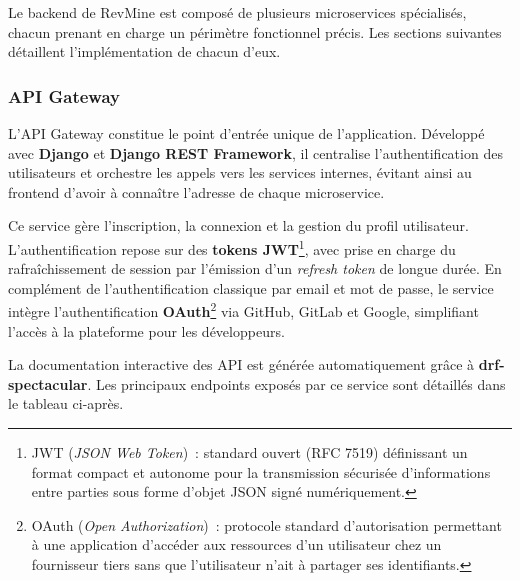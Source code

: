 Le backend de RevMine est composé de plusieurs microservices spécialisés, chacun prenant en
charge un périmètre fonctionnel précis. Les sections suivantes détaillent l'implémentation de
chacun d'eux.

\subsubsection{API Gateway}

L'API Gateway constitue le point d'entrée unique de l'application. Développé avec
\textbf{Django} et \textbf{Django REST Framework}, il centralise l'authentification des
utilisateurs et orchestre les appels vers les services internes, évitant ainsi au frontend
d'avoir à connaître l'adresse de chaque microservice.

Ce service gère l'inscription, la connexion et la gestion du profil utilisateur. L'authentification
repose sur des \textbf{tokens JWT}\footnote{JWT (\textit{JSON Web Token})~: standard ouvert (RFC
7519) définissant un format compact et autonome pour la transmission sécurisée d'informations entre
parties sous forme d'objet JSON signé numériquement.}, avec prise en charge du rafraîchissement
de session par l'émission d'un \textit{refresh token} de longue durée. En complément de
l'authentification classique par email et mot de passe, le service intègre l'authentification
\textbf{OAuth}\footnote{OAuth (\textit{Open Authorization})~: protocole standard d'autorisation
permettant à une application d'accéder aux ressources d'un utilisateur chez un fournisseur tiers
sans que l'utilisateur n'ait à partager ses identifiants.} via GitHub, GitLab et Google,
simplifiant l'accès à la plateforme pour les développeurs.

La documentation interactive des API est générée automatiquement grâce à
\textbf{drf-spectacular}. Les principaux endpoints exposés par ce service sont détaillés dans
le tableau ci-après.

